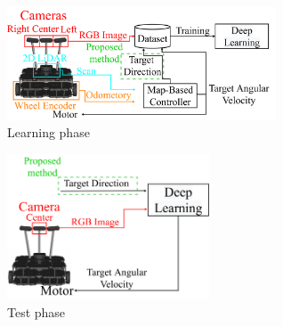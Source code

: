 \documentclass[10pt]{jarticle}
\begin{document}
    \begin{center}
        \begin{figure}[htb]
            \centering
            \includegraphics[width=8cm]{./fig/system_learning_app.pdf}
            \caption{Learning phase}
            \label{fig:system_learning}
        \end{figure}
    \end{center}
    \begin{center}
        \begin{figure}[htb]
            \centering
            \includegraphics[width=6cm]{./fig/system_test_app.pdf}
            \caption{Test phase}
            \label{fig:system_test}
        \end{figure}
    \end{center}
    \vspace{-1zh}
\end{document}
